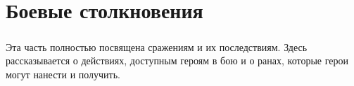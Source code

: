 \chapter{Боевые столкновения}
\paragraph{}
Эта часть полностью посвящена сражениям и их последствиям.
Здесь рассказывается о действиях, доступным героям в бою
и о ранах, которые герои могут нанести и получить.






\ifx\islight\undefined

\fi